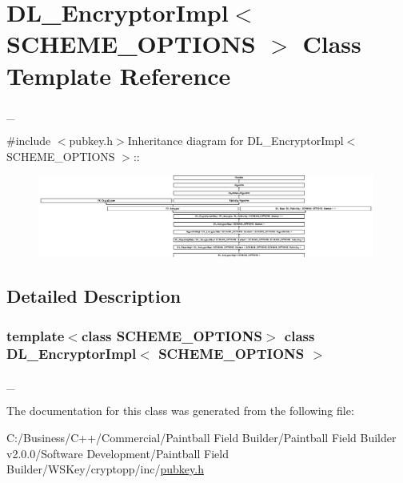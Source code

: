 \hypertarget{class_d_l___encryptor_impl}{
\section{DL\_\-EncryptorImpl$<$ SCHEME\_\-OPTIONS $>$ Class Template Reference}
\label{class_d_l___encryptor_impl}
}


\_\-  


{\ttfamily \#include $<$pubkey.h$>$}Inheritance diagram for DL\_\-EncryptorImpl$<$ SCHEME\_\-OPTIONS $>$::\begin{figure}[H]
\begin{center}
\leavevmode
\includegraphics[height=2.6982cm]{class_d_l___encryptor_impl}
\end{center}
\end{figure}


\subsection{Detailed Description}
\subsubsection*{template$<$class SCHEME\_\-OPTIONS$>$ class DL\_\-EncryptorImpl$<$ SCHEME\_\-OPTIONS $>$}

\_\- 

The documentation for this class was generated from the following file:\begin{DoxyCompactItemize}
\item 
C:/Business/C++/Commercial/Paintball Field Builder/Paintball Field Builder v2.0.0/Software Development/Paintball Field Builder/WSKey/cryptopp/inc/\hyperlink{pubkey_8h}{pubkey.h}\end{DoxyCompactItemize}
